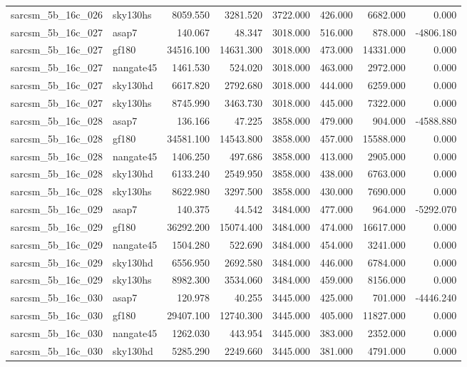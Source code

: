 \begin{tabular}{llrrrrrr}
sarcsm\_5b\_16c\_026 & sky130hs & 8059.550 & 3281.520 & 3722.000 & 426.000 & 6682.000 & 0.000 \\
sarcsm\_5b\_16c\_027 & asap7 & 140.067 & 48.347 & 3018.000 & 516.000 & 878.000 & -4806.180 \\
sarcsm\_5b\_16c\_027 & gf180 & 34516.100 & 14631.300 & 3018.000 & 473.000 & 14331.000 & 0.000 \\
sarcsm\_5b\_16c\_027 & nangate45 & 1461.530 & 524.020 & 3018.000 & 463.000 & 2972.000 & 0.000 \\
sarcsm\_5b\_16c\_027 & sky130hd & 6617.820 & 2792.680 & 3018.000 & 444.000 & 6259.000 & 0.000 \\
sarcsm\_5b\_16c\_027 & sky130hs & 8745.990 & 3463.730 & 3018.000 & 445.000 & 7322.000 & 0.000 \\
sarcsm\_5b\_16c\_028 & asap7 & 136.166 & 47.225 & 3858.000 & 479.000 & 904.000 & -4588.880 \\
sarcsm\_5b\_16c\_028 & gf180 & 34581.100 & 14543.800 & 3858.000 & 457.000 & 15588.000 & 0.000 \\
sarcsm\_5b\_16c\_028 & nangate45 & 1406.250 & 497.686 & 3858.000 & 413.000 & 2905.000 & 0.000 \\
sarcsm\_5b\_16c\_028 & sky130hd & 6133.240 & 2549.950 & 3858.000 & 438.000 & 6763.000 & 0.000 \\
sarcsm\_5b\_16c\_028 & sky130hs & 8622.980 & 3297.500 & 3858.000 & 430.000 & 7690.000 & 0.000 \\
sarcsm\_5b\_16c\_029 & asap7 & 140.375 & 44.542 & 3484.000 & 477.000 & 964.000 & -5292.070 \\
sarcsm\_5b\_16c\_029 & gf180 & 36292.200 & 15074.400 & 3484.000 & 474.000 & 16617.000 & 0.000 \\
sarcsm\_5b\_16c\_029 & nangate45 & 1504.280 & 522.690 & 3484.000 & 454.000 & 3241.000 & 0.000 \\
sarcsm\_5b\_16c\_029 & sky130hd & 6556.950 & 2692.580 & 3484.000 & 446.000 & 6784.000 & 0.000 \\
sarcsm\_5b\_16c\_029 & sky130hs & 8982.300 & 3534.060 & 3484.000 & 459.000 & 8156.000 & 0.000 \\
sarcsm\_5b\_16c\_030 & asap7 & 120.978 & 40.255 & 3445.000 & 425.000 & 701.000 & -4446.240 \\
sarcsm\_5b\_16c\_030 & gf180 & 29407.100 & 12740.300 & 3445.000 & 405.000 & 11827.000 & 0.000 \\
sarcsm\_5b\_16c\_030 & nangate45 & 1262.030 & 443.954 & 3445.000 & 383.000 & 2352.000 & 0.000 \\
sarcsm\_5b\_16c\_030 & sky130hd & 5285.290 & 2249.660 & 3445.000 & 381.000 & 4791.000 & 0.000 \\

\end{tabular}
